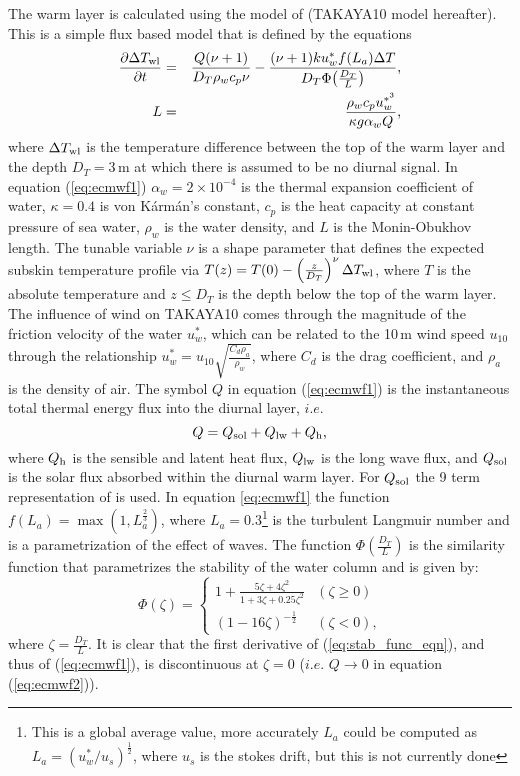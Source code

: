 \documentclass[../main/NEMO_manual]{subfiles}
\begin{document}
The warm layer is calculated using the model of \citet{Takaya_al_JGR10} (TAKAYA10 model hereafter).
This is a simple flux based model that is defined by the equations
\begin{align}
\frac{\partial{\Delta T_{\rm{wl}}}}{\partial{t}}&=&\frac{Q(\nu+1)}{D_T\rho_w c_p
\nu}-\frac{(\nu+1)ku^*_{w}f(L_a)\Delta T}{D_T\Phi\!\left(\frac{D_T}{L}\right)} \mbox{,}
\label{eq:ecmwf1} \\
L&=&\frac{\rho_w c_p u^{*^3}_{w}}{\kappa g \alpha_w Q }\mbox{,}\label{eq:ecmwf2}
\end{align}
where $\Delta T_{\rm{wl}}$ is the temperature difference between the top of the warm layer and the depth $D_T=3$\,m at which there is assumed to be no diurnal signal.
In equation (\autoref{eq:ecmwf1}) $\alpha_w=2\times10^{-4}$ is the thermal expansion coefficient of water,
$\kappa=0.4$ is von K\'{a}rm\'{a}n's constant, $c_p$ is the heat capacity at constant pressure of sea water,
$\rho_w$ is the water density, and $L$ is the Monin-Obukhov length.
The tunable variable $\nu$ is a shape parameter that defines the expected subskin temperature profile via
$T(z) = T(0) - \left( \frac{z}{D_T} \right)^\nu \Delta T_{\rm{wl}}$,
where $T$ is the absolute temperature and $z\le D_T$ is the depth below the top of the warm layer.
The influence of wind on TAKAYA10 comes through the magnitude of the friction velocity of the water $u^*_{w}$,
which can be related to the 10\,m wind speed $u_{10}$ through
the relationship $u^*_{w} = u_{10}\sqrt{\frac{C_d\rho_a}{\rho_w}}$, where $C_d$ is the drag coefficient,
and $\rho_a$ is the density of air.
The symbol $Q$ in equation (\autoref{eq:ecmwf1}) is the instantaneous total thermal energy flux into
the diurnal layer, $i.e.$
\[
  Q = Q_{\rm{sol}} + Q_{\rm{lw}} + Q_{\rm{h}}\mbox{,}
\]
where $Q_{\rm{h}}$ is the sensible and latent heat flux, $Q_{\rm{lw}}$ is the long wave flux,
and $Q_{\rm{sol}}$ is the solar flux absorbed within the diurnal warm layer.
For $Q_{\rm{sol}}$ the 9 term representation of \citet{Gentemann_al_JGR09} is used.
In equation \autoref{eq:ecmwf1} the function $f(L_a)=\max(1,L_a^{\frac{2}{3}})$,
where $L_a=0.3$\footnote{
  This is a global average value, more accurately $L_a$ could be computed as $L_a=(u^*_{w}/u_s)^{\frac{1}{2}}$,
  where $u_s$ is the stokes drift, but this is not currently done
} is the turbulent Langmuir number and is a parametrization of the effect of waves.
The function $\Phi\!\left(\frac{D_T}{L}\right)$ is the similarity function that
parametrizes the stability of the water column and is given by:
\begin{equation}
\Phi(\zeta) = \left\{ \begin{array}{cc} 1 + \frac{5\zeta +
4\zeta^2}{1+3\zeta+0.25\zeta^2} &(\zeta \ge 0) \\
                                    (1 - 16\zeta)^{-\frac{1}{2}} & (\zeta < 0) \mbox{,}
                                    \end{array} \right. \label{eq:stab_func_eqn}
\end{equation}
where $\zeta=\frac{D_T}{L}$.  It is clear that the first derivative of (\autoref{eq:stab_func_eqn}),
and thus of (\autoref{eq:ecmwf1}), is discontinuous at $\zeta=0$ ($i.e.$ $Q\rightarrow0$ in
equation (\autoref{eq:ecmwf2})).
\end{document}
